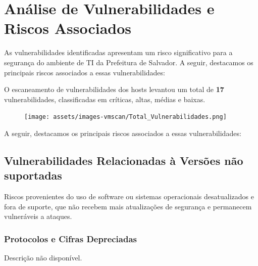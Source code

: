 \documentclass[a4paper,12pt]{article}
\begin{document}
\section{Análise de Vulnerabilidades e Riscos Associados}
As vulnerabilidades identificadas apresentam um risco significativo para a segurança do ambiente de TI da Prefeitura de Salvador. A seguir, destacamos os principais riscos associados a essas vulnerabilidades:

O escaneamento de vulnerabilidades dos hosts levantou um total de \textbf{17} vulnerabilidades, classificadas em críticas, altas, médias e baixas.

   \begin{figure}[h!]
    \centering
    \texttt{[image: assets/images-vmscan/Total\_Vulnerabilidades.png]} 
    \end{figure}
    \FloatBarrier

A seguir, destacamos os principais riscos associados a essas vulnerabilidades: 

\subsection{Vulnerabilidades Relacionadas à Versões não suportadas}
Riscos provenientes do uso de software ou sistemas operacionais desatualizados e fora de suporte, que não recebem mais atualizações de segurança e permanecem vulneráveis a ataques.

\subsubsection{Protocolos e Cifras Depreciadas}
Descrição não disponível.
\end{document}
